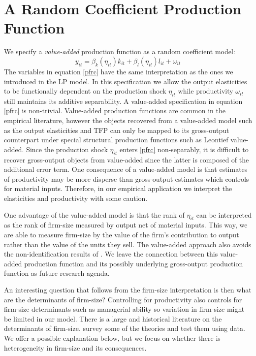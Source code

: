 \documentclass[11pt]{article}
\begin{document}
\section{A Random Coefficient Production Function} \label{ourmodel}
We specify a \textit{value-added} production function as a random coefficient model:
\begin{equation} \label{pfrc}
    y_{it}=\beta_{k}(\eta_{it})k_{it}+\beta_{l}(\eta_{it})l_{it}+\omega_{it}
\end{equation}
The variables in equation \eqref{pfrc} have the same interpretation as the ones we introduced in the LP model. In this specification we allow the output elasticities to be functionally dependent on the production shock $\eta_{it}$ while productivity $\omega_{it}$ still maintains its additive separability.
A value-added specification in equation \eqref{pfrc} is non-trivial. Value-added production functions are common in the empirical literature, however the objects recovered from a value-added model such as the output elasticities and TFP can only be mapped to its gross-output counterpart under special structural production functions such as Leontief value-added. Since the production shock $\eta_{it}$ enters \eqref{pfrc} non-separably, it is difficult to recover gross-output objects from value-added since the latter is composed of the additional error term. One consequence of a value-added model is that estimates of productivity may be more disperse than gross-output estimates which controls for material inputs. Therefore, in our empirical application we interpret the elasticities and productivity with some caution.

 One advantage of the value-added model is that the rank of $\eta_{it}$ can be interpreted as the rank of firm-size measured by output net of material inputs. This way, we are able to measure firm-size by the value of the firm's contribution to output rather than the value of the units they sell. The value-added approach also avoids the non-identification results of \cite{Gandhi2020}. We leave the connection between this value-added production function and its possibly underlying gross-output production function as future research agenda.

 An interesting question that follows from the firm-size interpretation is then what are the determinants of firm-size? Controlling for productivity also controls for firm-size determinants such as managerial ability so variation in firm-size might be limited in our model. There is a large and historical literature on the determinants of firm-size. \cite{Kumar1999} survey some of the theories and test them using data. We offer a possible explanation below, but we focus on whether there is heterogeneity in firm-size and its consequences. 
\end{document}
